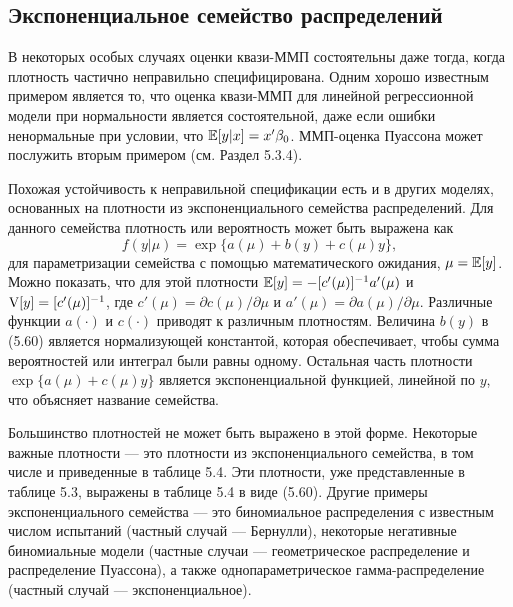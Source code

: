 \subsection{Экспоненциальное семейство распределений}

В некоторых особых случаях оценки квази-ММП состоятельны даже тогда, когда плотность частично неправильно специфицирована. Одним хорошо известным примером является то, что оценка квази-ММП для линейной регрессионной модели при нормальности является состоятельной, даже если ошибки ненормальные при условии, что $\mathbb{E}[y|x]=x' \beta_0$. ММП-оценка Пуассона может послужить вторым примером (см. Раздел 5.3.4).

Похожая устойчивость к неправильной спецификации есть и в других моделях, основанных на плотности из экспоненциального семейства распределений. Для данного семейства плотность или вероятность может быть выражена как
\begin{equation}
f(y|\mu)=\exp \{ a(\mu)+b(y)+c(\mu)y \},
\end{equation}
для параметризации семейства с помощью математического ожидания, $\mu=\mathbb{E}[y]$. Можно показать, что для этой плотности $\mathbb{E}[y]=-[c'(\mu)]^{-1}a'(\mu)$ и $\mathrm{V}[y]=[c'(\mu)]^{-1}$, где $c'(\mu)=\partial c(\mu) / \partial \mu$ и $a'(\mu)=\partial a(\mu) / \partial \mu$. Различные функции $a(\cdot)$ и $c(\cdot)$ приводят к различным плотностям. Величина $b(y)$ в (5.60) является нормализующей константой, которая обеспечивает, чтобы сумма вероятностей или интеграл были равны одному. Остальная часть плотности $\exp \{ a(\mu)+c(\mu)y \}$ является экспоненциальной функцией, линейной по $y$, что объясняет название семейства.

Большинство плотностей не может быть выражено в этой форме. Некоторые важные плотности --- это плотности из экспоненциального семейства, в том числе и приведенные в таблице 5.4. Эти плотности, уже представленные в таблице 5.3, выражены в таблице 5.4 в виде (5.60). Другие примеры экспоненциального семейства --- это биномиальное распределения с известным числом испытаний (частный случай --- Бернулли), некоторые негативные биномиальные модели (частные случаи --- геометрическое распределение и распределение Пуассона), а также однопараметрическое гамма-распределение (частный случай --- экспоненциальное).

